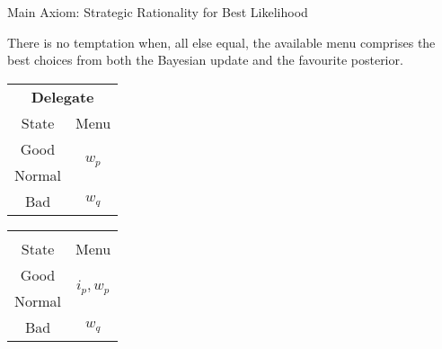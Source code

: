 \documentclass[usenames,dvipsnames,aspectratio=169,11pt, envcountsect, handout]{beamer}
\begin{document}
\begin{frame}{Main Axiom: Strategic Rationality for Best Likelihood}\label{srbl}

	\begin{axiom}\label{ax:srbl}
		There is no temptation when, all else equal, the available menu comprises the best choices from both the Bayesian update and the favourite posterior. \pause
	\end{axiom}

	\vfill

	\begin{table}[H]
		\centering
		\begin{minipage}{0.4\textwidth}
			\centering
			\begin{tabular}{c | c}
				\multicolumn{2}{c}{\textbf{Delegate}}                           \\
				State                & Menu                                     \\
				\hline
				{\color{blue}Good}   & \multirow{2}{*}{{\color{blue}\( w_p \)}} \\
				{\color{blue}Normal} &                                          \\
				Bad                  & \( w_q \)                                \\
			\end{tabular}
			\vspace{0.5cm} %
		\end{minipage}%
		\begin{minipage}{0.4\textwidth}
			\centering
			\begin{tabular}{c | c}
				\multicolumn{2}{c}{}                                                 \\
				State                & Menu                                          \\
				\hline
				{\color{blue}Good}   & \multirow{2}{*}{{\color{blue}\( i_p, w_p \)}} \\
				{\color{blue}Normal} &                                               \\
				Bad                  & \( w_q \)                                     \\
			\end{tabular}
			\vspace{0.5cm} %
		\end{minipage} %
	\end{table}

	\begin{flushright}
		\hyperlink{srblapp}{}
	\end{flushright}

\end{frame}
\end{document}
